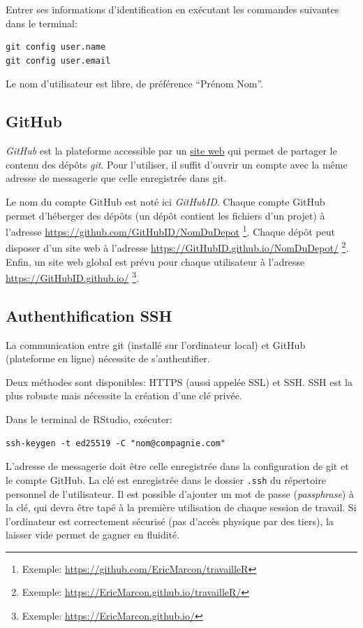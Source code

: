 \documentclass[
  12pt,
  french,
  a4paper,
  extrafontsizes,onecolumn,openright
  ]{memoir}
\begin{document}
Entrer ses informations d'identification en exécutant les commandes suivantes dans le terminal:

\begin{verbatim}
git config user.name
git config user.email
\end{verbatim}

Le nom d'utilisateur est libre, de préférence \enquote{Prénom Nom}.

\hypertarget{github}{%
\subsection{GitHub}\label{github}}

\emph{GitHub} est la plateforme accessible par un \href{https://github.com/}{site web} qui permet de partager le contenu des dépôts \emph{git}.
Pour l'utiliser, il suffit d'ouvrir un compte avec la même adresse de messagerie que celle enregistrée dans git.

Le nom du compte GitHub est noté ici \emph{GitHubID}.
Chaque compte GitHub permet d'héberger des dépôts (un dépôt contient les fichiers d'un projet) à l'adresse \url{https://github.com/GitHubID/NomDuDepot} \footnote{Exemple: \url{https://github.com/EricMarcon/travailleR}}.
Chaque dépôt peut disposer d'un site web à l'adresse \url{https://GitHubID.github.io/NomDuDepot/} \footnote{Exemple: \url{https://EricMarcon.github.io/travailleR/}}.
Enfin, un site web global est prévu pour chaque utilisateur à l'adresse \url{https://GitHubID.github.io/} \footnote{Exemple: \url{https://EricMarcon.github.io/}}.

\hypertarget{sec:SSH}{%
\subsection{Authenthification SSH}\label{sec:SSH}}

La communication entre git (installé sur l'ordinateur local) et GitHub (plateforme en ligne) nécessite de s'authentifier.

Deux méthodes sont disponibles: HTTPS (aussi appelée SSL) et SSH.
SSH est la plus robuste mais nécessite la création d'une clé privée.

Dans le terminal de RStudio, exécuter:

\begin{verbatim}
ssh-keygen -t ed25519 -C "nom@compagnie.com"
\end{verbatim}

L'adresse de messagerie doit être celle enregistrée dans la configuration de git et le compte GitHub.
La clé est enregistrée dans le dossier \texttt{.ssh} du répertoire personnel de l'utilisateur.
Il est possible d'ajouter un mot de passe (\emph{passphrase}) à la clé, qui devra être tapé à la première utilisation de chaque session de travail.
Si l'ordinateur est correctement sécurisé (pas d'accès physique par des tiers), la laisser vide permet de gagner en fluidité.
\end{document}
